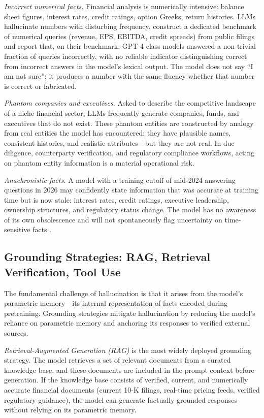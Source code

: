 \emph{Incorrect numerical facts.} Financial analysis is numerically intensive: balance
sheet figures, interest rates, credit ratings, option Greeks, return histories. LLMs
hallucinate numbers with disturbing frequency. \citet{kang2023hallucination} construct
a dedicated benchmark of numerical queries (revenue, EPS, EBITDA, credit spreads) from
public filings and report that, on their benchmark, GPT-4 class models answered a non-trivial fraction of queries incorrectly, with no reliable indicator distinguishing correct from
incorrect answers in the model's lexical output. The model does not say ``I am not
sure''; it produces a number with the same fluency whether that number is correct or
fabricated.

\emph{Phantom companies and executives.} Asked to describe the competitive landscape
of a niche financial sector, LLMs frequently generate companies, funds, and executives
that do not exist. These phantom entities are constructed by analogy from real entities
the model has encountered: they have plausible names, consistent histories, and realistic
attributes---but they are not real. In due diligence, counterparty verification, and
regulatory compliance workflows, acting on phantom entity information is a material
operational risk.

\emph{Anachronistic facts.} A model with a training cutoff of mid-2024 answering
questions in 2026 may confidently state information that was accurate at training
time but is now stale: interest rates, credit ratings, executive leadership, ownership
structures, and regulatory status change. The model has no awareness of its own
obsolescence and will not spontaneously flag uncertainty on time-sensitive facts
\cite{ji2023survey}.

\subsection{Grounding Strategies: RAG, Retrieval Verification, Tool Use}
\label{sec:ch13-grounding-strategies}

The fundamental challenge of hallucination is that it arises from the model's
parametric memory---its internal representation of facts encoded during pretraining.
Grounding strategies mitigate hallucination by reducing the model's reliance on
parametric memory and anchoring its responses to verified external sources.

\emph{Retrieval-Augmented Generation (RAG)} \cite{lewis2020rag} is the most widely
deployed grounding strategy. The model retrieves a set of relevant documents from a
curated knowledge base, and these documents are included in the prompt context before
generation. If the knowledge base consists of verified, current, and numerically
accurate financial documents (current 10-K filings, real-time pricing feeds, verified
regulatory guidance), the model can generate factually grounded responses without
relying on its parametric memory.

